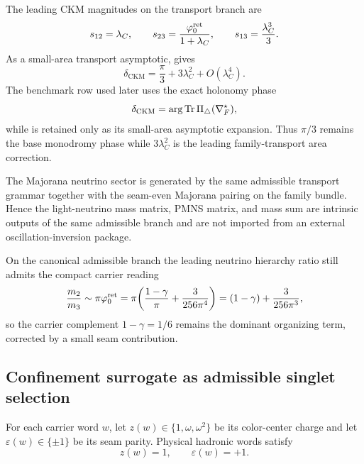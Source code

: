 The leading CKM magnitudes on the transport branch are
\begin{equation}
\label{eq:ckm-magnitudes}
s_{12}=\lambda_C,
\qquad
s_{23}=\frac{\varphi_0^{\mathrm{ret}}}{1+\lambda_C},
\qquad
s_{13}=\frac{\lambda_C^3}{3}.
\end{equation}
As a small-area transport asymptotic,  gives
\begin{equation}
\label{eq:ckm-phase}
\delta_{\mathrm{CKM}}=\frac{\pi}{3}+3\lambda_C^2+O(\lambda_C^4).
\end{equation}
The benchmark row used later uses the exact holonomy phase
\[
\delta_{\mathrm{CKM}}=\arg\operatorname{Tr}\Pi_\triangle(\nabla_F^\star),
\]
while  is retained only as its small-area asymptotic expansion. Thus
$\pi/3$ remains the base monodromy phase while $3\lambda_C^2$ is the leading
family-transport area correction.

\begin{theorem}
The Majorana neutrino sector is generated by the same admissible transport grammar together
with the seam-even Majorana pairing on the family bundle. Hence the light-neutrino mass
matrix, PMNS matrix, and mass sum are intrinsic outputs of the same admissible branch and are
not imported from an external oscillation-inversion package.
\end{theorem}

\begin{remark}
On the canonical admissible branch the leading neutrino hierarchy ratio still admits the
compact carrier reading
\[
\frac{m_2}{m_3}\sim \pi\varphi_0^{\mathrm{ret}}
=
\pi\!\left(\frac{1-\gamma}{\pi}+\frac{3}{256\pi^4}\right)
=
(1-\gamma)+\frac{3}{256\pi^3},
\]
so the carrier complement $1-\gamma=1/6$ remains the dominant organizing term, corrected by a
small seam contribution.
\end{remark}

\subsection{Confinement surrogate as admissible singlet selection}

\begin{proposition}
For each carrier word $w$, let $z(w)\in\{1,\omega,\omega^2\}$ be its color-center charge and let $\varepsilon(w)\in\{\pm1\}$ be its seam parity. Physical hadronic words satisfy
\[
z(w)=1,
\qquad
\varepsilon(w)=+1.
\]
\end{proposition}

